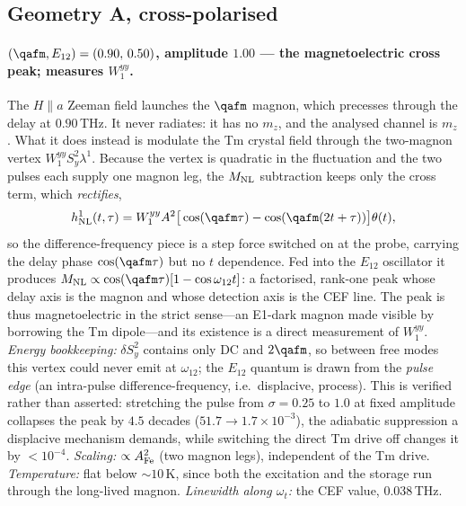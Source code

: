 \subsection{Geometry A, cross-polarised}
\label{si:peaksAcross}

\paragraph{$(\qafm,E_{12})=(0.90,\,0.50)$, amplitude $1.00$ --- the
magnetoelectric cross peak; measures $W^{yy}_1$.}
The $H\!\parallel\!a$ Zeeman field launches the $\qafm$ magnon, which
precesses through the delay at $0.90$\,THz.  It never radiates: it has
no $m_z$, and the analysed channel is $m_z$.  What it does instead is
modulate the Tm crystal field through the two-magnon vertex
$W^{yy}_1S_y^2\lambda^1$.  Because the vertex is quadratic in the
fluctuation and the two pulses each supply one magnon leg, the
$M_{\rm NL}$ subtraction keeps only the cross term, which
\emph{rectifies},
\begin{equation}
  h^1_{\rm NL}(t,\tau)=W^{yy}_1A^2\big[\cos(\qafm\tau)
  -\cos(\qafm(2t+\tau))\big]\theta(t),
\end{equation}
so the difference-frequency piece is a step force switched on at the
probe, carrying the delay phase $\cos(\qafm\tau)$ but no $t$
dependence.  Fed into the $E_{12}$ oscillator it produces
$M_{\rm NL}\propto\cos(\qafm\tau)[1-\cos\omega_{12}t]$: a factorised,
rank-one peak whose delay axis is the magnon and whose detection axis
is the CEF line.  The peak is thus magnetoelectric in the strict
sense---an E1-dark magnon made visible by borrowing the Tm dipole---and
its existence is a direct measurement of $W^{yy}_1$.
\emph{Energy bookkeeping:} $\delta S_y^2$ contains only DC and
$2\qafm$, so between free modes this vertex could never emit at
$\omega_{12}$; the $E_{12}$ quantum is drawn from the \emph{pulse edge}
(an intra-pulse difference-frequency, i.e.\ displacive, process).  This
is verified rather than asserted: stretching the pulse from
$\sigma=0.25$ to $1.0$ at fixed amplitude collapses the peak by $4.5$
decades ($51.7\to1.7\times10^{-3}$), the adiabatic suppression a
displacive mechanism demands, while switching the direct Tm drive off
changes it by $<10^{-4}$.
\emph{Scaling:} $\propto A_{\rm Fe}^2$ (two magnon legs), independent
of the Tm drive.  \emph{Temperature:} flat below $\sim10$\,K, since
both the excitation and the storage run through the long-lived magnon.
\emph{Linewidth along $\omega_t$:} the CEF value, $0.038$\,THz.

